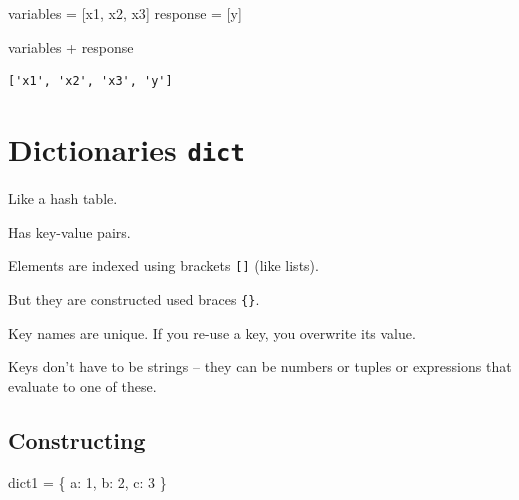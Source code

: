 \documentclass[
  letterpaper,
  DIV=11,
  numbers=noendperiod]{scrreprt}
\newenvironment{Shaded}{\begin{snugshade}}{\end{snugshade}}
\newcommand{\DecValTok}[1]{\textcolor[rgb]{0.68,0.00,0.00}{#1}}
\newcommand{\NormalTok}[1]{\textcolor[rgb]{0.00,0.23,0.31}{#1}}
\newcommand{\OperatorTok}[1]{\textcolor[rgb]{0.37,0.37,0.37}{#1}}
\newcommand{\StringTok}[1]{\textcolor[rgb]{0.13,0.47,0.30}{#1}}
\begin{document}
\begin{Shaded}
\begin{Highlighting}[]
\NormalTok{variables }\OperatorTok{=}\NormalTok{ [}\StringTok{\textquotesingle{}x1\textquotesingle{}}\NormalTok{, }\StringTok{\textquotesingle{}x2\textquotesingle{}}\NormalTok{, }\StringTok{\textquotesingle{}x3\textquotesingle{}}\NormalTok{]}
\NormalTok{response }\OperatorTok{=}\NormalTok{ [}\StringTok{\textquotesingle{}y\textquotesingle{}}\NormalTok{]}
\end{Highlighting}
\end{Shaded}

\begin{Shaded}
\begin{Highlighting}[]
\NormalTok{variables }\OperatorTok{+}\NormalTok{ response}
\end{Highlighting}
\end{Shaded}

\begin{verbatim}
['x1', 'x2', 'x3', 'y']
\end{verbatim}

\hypertarget{dictionaries-dict-1}{%
\chapter{\texorpdfstring{Dictionaries
\texttt{dict}}{Dictionaries dict}}\label{dictionaries-dict-1}}

Like a hash table.

Has key-value pairs.

Elements are indexed using brackets \texttt{{[}{]}} (like lists).

But they are constructed used braces \texttt{\{\}}.

Key names are unique. If you re-use a key, you overwrite its value.

Keys don't have to be strings -- they can be numbers or tuples or
expressions that evaluate to one of these.

\hypertarget{constructing-4}{%
\section{Constructing}\label{constructing-4}}

\begin{Shaded}
\begin{Highlighting}[]
\NormalTok{dict1 }\OperatorTok{=}\NormalTok{ \{}
    \StringTok{\textquotesingle{}a\textquotesingle{}}\NormalTok{: }\DecValTok{1}\NormalTok{,}
    \StringTok{\textquotesingle{}b\textquotesingle{}}\NormalTok{: }\DecValTok{2}\NormalTok{,}
    \StringTok{\textquotesingle{}c\textquotesingle{}}\NormalTok{: }\DecValTok{3}
\NormalTok{\}}
\end{Highlighting}
\end{Shaded}
\end{document}
